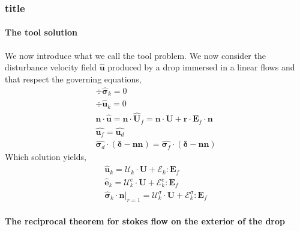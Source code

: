 \subsubsection*{title}
\paragraph*{The tool solution}

We now introduce what we call the tool problem. 
We now consider the disturbance velocity field $\hat{\textbf{u}}$ produced by a drop immersed in a linear flows and that respect the governing equations, 
\begin{align*}
    \div \hat{\bm\sigma}_k = 0 \\
    \div \hat{\textbf{u}}_k = 0 \\
    \textbf{n}\cdot \hat{\textbf{u}}=  \textbf{n}\cdot \hat{\textbf{U}}_f = \textbf{n}\cdot \textbf{U} + \textbf{r}\cdot \textbf{E}_f \cdot \textbf{n}\\
    \hat{\textbf{u}_f} = \hat{\textbf{u}_d}\\
    \hat{\bm\sigma_d}\cdot (\bm\delta - \textbf{nn}) = \hat{\bm\sigma_f}\cdot (\bm\delta - \textbf{nn})
\end{align*} 
Which solution yields, 
\begin{align*}
    \hat{\textbf{u}}_k = \mathcal{U}_k\cdot \textbf{U}+ \mathcal{E}_k : \textbf{E}_f\\
    \hat{\textbf{e}}_k = \mathcal{U}_k^e\cdot \textbf{U}+ \mathcal{E}_k^e : \textbf{E}_f\\
    \hat{\bm\sigma}_k\cdot \textbf{n}|_{r=1} = \mathcal{U}_k^\sigma\cdot \textbf{U}+ \mathcal{E}_k^\sigma : \textbf{E}_f
\end{align*}

\paragraph*{The reciprocal theorem for stokes flow on the exterior of the drop}


